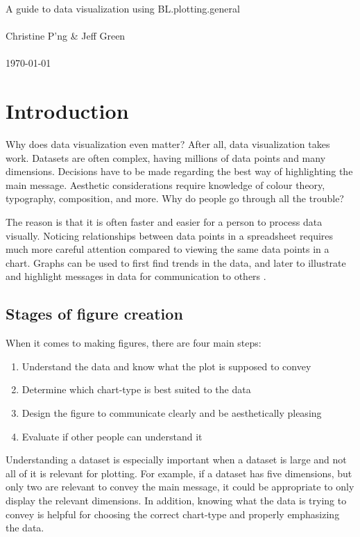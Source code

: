 \documentclass[letterpaper]{article}\usepackage[]{graphicx}\usepackage[]{color}
\begin{document}
\begin{center}
	\LARGE{A guide to data visualization using BL.plotting.general}\\~\\
	\large{Christine P'ng \& Jeff Green}\\~\\
	\large{\today}
\end{center}
\tableofcontents

\newpage
\section{Introduction}
Why does data visualization even matter? After all, data visualization takes work. Datasets are often complex, having millions of data points and many dimensions. Decisions have to be made regarding the best way of highlighting the main message. Aesthetic considerations require knowledge of colour theory, typography, composition, and more. Why do people go through all the trouble?

The reason is that it is often faster and easier for a person to process data visually. Noticing relationships between data points in a spreadsheet requires much more careful attention compared to viewing the same data points in a chart. Graphs can be used to first find trends in the data, and later to illustrate and highlight messages in data for communication to others \cite{Anscombe}\cite{wong-dataexploration}.

\subsection{Stages of figure creation}
When it comes to making figures, there are four main steps:
\begin{enumerate}
\item Understand the data and know what the plot is supposed to convey
\item Determine which chart-type is best suited to the data
\item Design the figure to communicate clearly and be aesthetically pleasing
\item Evaluate if other people can understand it
\end{enumerate}

Understanding a dataset is especially important when a dataset is large and not all of it is relevant for plotting. For example, if a dataset has five dimensions, but only two are relevant to convey the main message, it could be appropriate to only display the relevant dimensions. In addition, knowing what the data is trying to convey is helpful for choosing the correct chart-type and properly emphasizing the data. 
\end{document}
